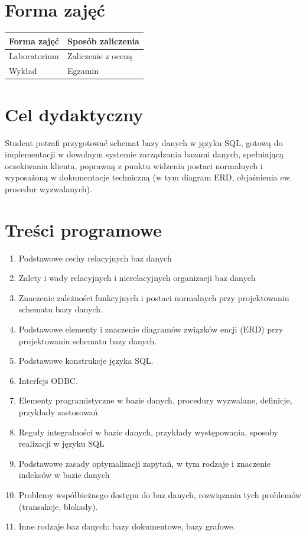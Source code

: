 \documentclass[12pt, a4paper]{article}
\begin{document}
\section{Forma zajęć}

\begin{tabular}{ll}
  \hline
  \textbf{Forma zajęć} & \textbf{Sposób zaliczenia} \\
  \hline
  Laboratorium & Zaliczenie z oceną \\
  Wykład & Egzamin \\
  \hline
\end{tabular}

\section{Cel dydaktyczny}

Student potrafi przygotować schemat bazy danych w języku SQL, gotową do implementacji w dowolnym systemie zarządzania bazami danych, spełniającą oczekiwania klienta, poprawną z punktu widzenia postaci normalnych i wyposażoną w dokumentacje techniczną (w tym diagram ERD, objaśnienia ew. procedur wyzwalanych).

\section{Treści programowe}

\begin{enumerate}
  \item Podstawowe cechy relacyjnych baz danych
  \item Zalety i wady relacyjnych i nierelacyjnych organizacji baz danych
  \item Znaczenie zależności funkcyjnych i postaci normalnych przy projektowaniu schematu bazy danych.
  \item Podstawowe elementy i znaczenie diagramów związków encji (ERD) przy projektowaniu schematu bazy danych.
  \item Podstawowe konstrukcje języka SQL.
  \item Interfejs ODBC.
  \item Elementy programistyczne w bazie danych, procedury wyzwalane, definicje, przykłady zastosowań.
  \item Reguły integralności w bazie danych, przykłady występowania, sposoby realizacji w języku SQL
  \item Podstawowe zasady optymalizacji zapytań, w tym rodzaje i znaczenie indeksów w bazie danych
  \item Problemy współbieżnego dostępu do baz danych, rozwiązania tych problemów (transakcje, blokady).
  \item Inne rodzaje baz danych: bazy dokumentowe, bazy grafowe.
\end{enumerate}
\end{document}

